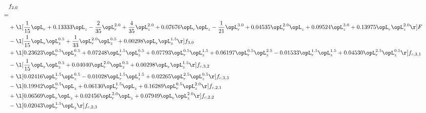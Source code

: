 \begin{alignat}{2} 
\label{eq:f_20_2} 
& f_{2,0} \nonumber \\ 
 = \\ 
& + \l[ \frac{1}{15} \opL_r +  0.13333 \opL_z - \frac{2}{35} \opL_r^{2.0} + \frac{4}{35} \opL_z^{2.0} +  0.07676 \opL_r \opL_z - \frac{1}{21} \opL_r^{3.0} +  0.04535 \opL_r^{2.0} \opL_z +  0.09524 \opL_z^{3.0} +  0.13975 \opL_r \opL_z^{2.0}  \r] F \nonumber \\ 
& - \l[ \frac{1}{15} \opL_r \opL_z^{0.5} + \frac{1}{33} \opL_r^{2.0} \opL_z^{0.5} +  0.00298 \opL_r \opL_z^{1.5}  \r] f_{3,0} \nonumber \\ 
& + \l[  0.23623 \opL_r^{0.5} \opL_z^{0.5} +  0.07248 \opL_r^{1.5} \opL_z^{0.5} +  0.07793 \opL_r^{0.5} \opL_z^{1.5} +  0.06197 \opL_r^{0.5} \opL_z^{2.5}   -0.01533 \opL_r^{1.5} \opL_z^{1.5} +  0.04530 \opL_r^{2.5} \opL_z^{0.5}  \r] f_{c,3,1} \nonumber \\ 
& - \l[ \frac{1}{15} \opL_r \opL_z^{0.5} +  0.04040 \opL_r^{2.0} \opL_z^{0.5} +  0.00298 \opL_r \opL_z^{1.5}  \r] f_{c,3,2} \nonumber \\ 
& + \l[  0.02416 \opL_r^{1.5} \opL_z^{0.5}   -0.01028 \opL_r^{1.5} \opL_z^{1.5} +  0.02265 \opL_r^{2.5} \opL_z^{0.5}  \r] f_{c,3,3} \nonumber \\ 
& - \l[  0.19942 \opL_r^{0.5} \opL_z +  0.06130 \opL_r^{1.5} \opL_z +  0.16289 \opL_r^{0.5} \opL_z^{2.0}  \r] f_{c,2,1} \nonumber \\ 
& + \l[  0.06569 \opL_r \opL_z +  0.02456 \opL_r^{2.0} \opL_z +  0.07949 \opL_r \opL_z^{2.0}  \r] f_{c,2,2} \nonumber \\ 
& - \l[  0.02043 \opL_r^{1.5} \opL_z  \r] f_{c,2,3} \nonumber \\ 
\end{alignat} 


